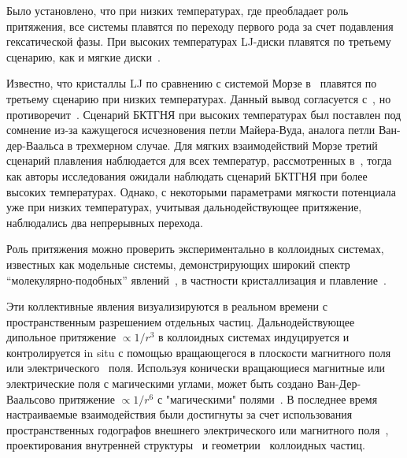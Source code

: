 Было установлено, что при низких температурах, где преобладает роль притяжения, все системы плавятся по переходу первого рода за счет подавления гексатической фазы.
При высоких температурах LJ-диски плавятся по третьему сценарию, как и мягкие диски~\cite{10.1103/physrevlett.114.035702}.

Известно, что кристаллы LJ по сравнению с системой Морзе в~\cite{10.1103/physrevb.103.094107} плавятся по третьему сценарию при низких температурах. 
Данный вывод согласуется с~\cite{10.1103/physreve.99.022145}, но противоречит~\cite{10.1103/physrevlett.114.035702}. 
Сценарий БКТГНЯ при высоких температурах был поставлен под сомнение из-за кажущегося исчезновения петли Майера-Вуда, аналога петли Ван-дер-Ваальса в трехмерном случае.
Для мягких взаимодействий Морзе третий сценарий плавления наблюдается для всех температур, рассмотренных в~\cite{10.1103/physrevb.103.094107}, тогда как авторы исследования ожидали наблюдать сценарий БКТГНЯ при более высоких температурах.
Однако, с некоторыми параметрами мягкости потенциала уже при низких температурах, учитывая дальнодействующее притяжение, наблюдались два непрерывных перехода.

Роль притяжения можно проверить экспериментально в коллоидных системах, известных как модельные системы, демонстрирующих широкий спектр ``молекулярно-подобных'' явлений~\cite{book.fernandez, book.ivlev, 10.1016/0370-1573(94)90017-5, 10.1038/natrevmats.2015.11, 10.1039/c9sm01953g}, в частности кристаллизация и плавление~\cite{10.1126/science.1112399, 10.1039/c2sm26473k, 10.1103/physrevlett.82.2721, 10.1103/physrevlett.85.3656, 10.1103/physrevlett.118.088003, 10.1039/c2sm27654b, 10.1126/science.1224763, 10.1038/s41598-021-97124-7}.

Эти коллективные явления визуализируются в реальном времени с пространственным разрешением отдельных частиц.
Дальнодействующее дипольное притяжение $\propto 1/r^3$ в коллоидных системах индуцируется и контролируется in situ с помощью вращающегося в плоскости магнитного поля~\cite{10.1088/0034-4885/76/12/126601, 10.1039/c3sm50306b, 10.1039/c3sm27620a, 10.1103/physrevmaterials.2.025602} или электрического~\cite{10.1088/1367-2630/8/11/267, 10.1063/1.3115641, 10.1021/la2014804, 10.1021/la500178b, 10.1039/c1sm06414b, 10.1038/s41598-017-14001-y} поля.
Используя конически вращающиеся магнитные или электрические поля с магическими углами, может быть создано Ван-Дер-Ваальсово притяжение $\propto 1/r^6$ с "магическими" полями~\cite{10.1021/la500896e, 10.1103/physrevlett.103.228301}.
В последнее время настраиваемые взаимодействия были достигнуты за счет использования пространственных годографов внешнего электрического или магнитного поля~\cite{10.1039/d0sm01046d}, проектирования внутренней структуры~\cite{10.1063/5.0055566} и геометрии~\cite{10.1063/5.0060705} коллоидных частиц.

